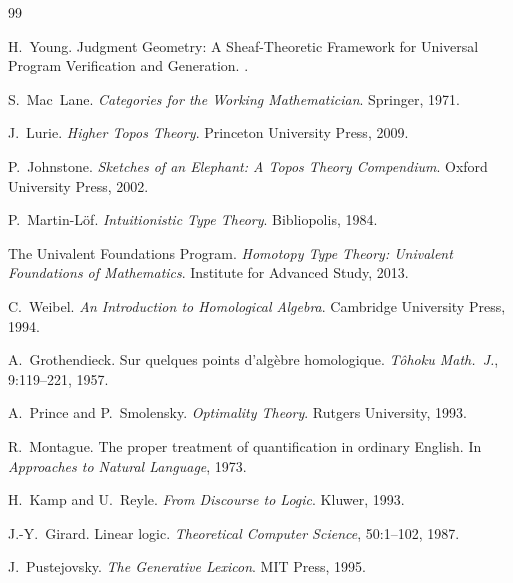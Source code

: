 \documentclass[12pt,openany]{book}
\theoremstyle{plain}
\theoremstyle{definition}
\theoremstyle{remark}
\begin{document}
\begin{thebibliography}{99}

H.~Young.
\newblock Judgment Geometry: A Sheaf-Theoretic Framework for
  Universal Program Verification and Generation.
.

S.~Mac~Lane.
\newblock \emph{Categories for the Working Mathematician}.
\newblock Springer, 1971.

J.~Lurie.
\newblock \emph{Higher Topos Theory}.
\newblock Princeton University Press, 2009.

P.~Johnstone.
\newblock \emph{Sketches of an Elephant: A Topos Theory Compendium}.
\newblock Oxford University Press, 2002.

P.~Martin-L\"of.
\newblock \emph{Intuitionistic Type Theory}.
\newblock Bibliopolis, 1984.

The Univalent Foundations Program.
\newblock \emph{Homotopy Type Theory: Univalent Foundations of Mathematics}.
\newblock Institute for Advanced Study, 2013.

C.~Weibel.
\newblock \emph{An Introduction to Homological Algebra}.
\newblock Cambridge University Press, 1994.

A.~Grothendieck.
\newblock Sur quelques points d'alg\`ebre homologique.
\newblock \emph{T\^ohoku Math.\ J.}, 9:119--221, 1957.

A.~Prince and P.~Smolensky.
\newblock \emph{Optimality Theory}.
\newblock Rutgers University, 1993.

R.~Montague.
\newblock The proper treatment of quantification in ordinary English.
\newblock In \emph{Approaches to Natural Language}, 1973.

H.~Kamp and U.~Reyle.
\newblock \emph{From Discourse to Logic}.
\newblock Kluwer, 1993.

J.-Y.~Girard.
\newblock Linear logic.
\newblock \emph{Theoretical Computer Science}, 50:1--102, 1987.

J.~Pustejovsky.
\newblock \emph{The Generative Lexicon}.
\newblock MIT Press, 1995.

\end{thebibliography}
\end{document}
